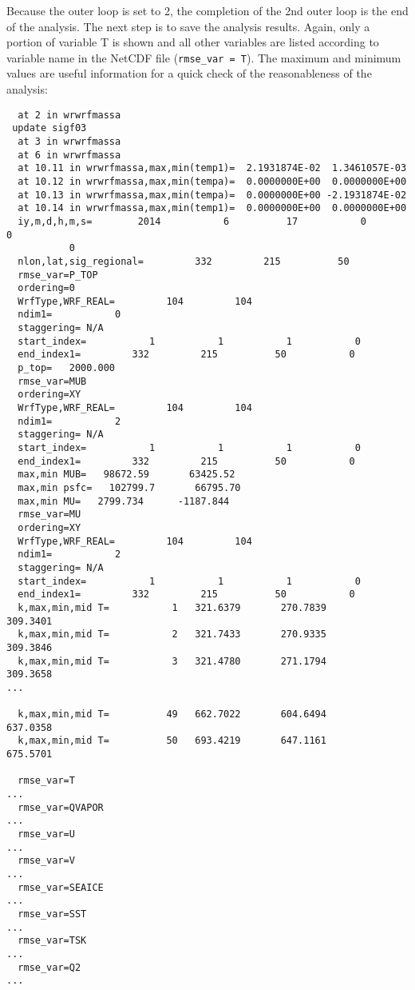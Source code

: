 Because the outer loop is set to 2, the completion of the 2nd outer loop is the end of the analysis. The next step is to save the analysis results. Again, only a portion of variable T is shown and all other variables are listed according to variable name in the NetCDF file (\verb|rmse_var = T|). The maximum and minimum values are useful information for a quick check of the reasonableness of the analysis:

\begin{scriptsize}
\begin{verbatim} 
  at 2 in wrwrfmassa
 update sigf03
  at 3 in wrwrfmassa
  at 6 in wrwrfmassa
  at 10.11 in wrwrfmassa,max,min(temp1)=  2.1931874E-02  1.3461057E-03
  at 10.12 in wrwrfmassa,max,min(tempa)=  0.0000000E+00  0.0000000E+00
  at 10.13 in wrwrfmassa,max,min(tempa)=  0.0000000E+00 -2.1931874E-02
  at 10.14 in wrwrfmassa,max,min(temp1)=  0.0000000E+00  0.0000000E+00
  iy,m,d,h,m,s=        2014           6          17           0           0
           0
  nlon,lat,sig_regional=         332         215          50
  rmse_var=P_TOP
  ordering=0
  WrfType,WRF_REAL=         104         104
  ndim1=           0
  staggering= N/A
  start_index=           1           1           1           0
  end_index1=         332         215          50           0
  p_top=   2000.000
  rmse_var=MUB
  ordering=XY
  WrfType,WRF_REAL=         104         104
  ndim1=           2
  staggering= N/A
  start_index=           1           1           1           0
  end_index1=         332         215          50           0
  max,min MUB=   98672.59       63425.52
  max,min psfc=   102799.7       66795.70
  max,min MU=   2799.734      -1187.844
  rmse_var=MU
  ordering=XY
  WrfType,WRF_REAL=         104         104
  ndim1=           2
  staggering= N/A
  start_index=           1           1           1           0
  end_index1=         332         215          50           0
  k,max,min,mid T=           1   321.6379       270.7839       309.3401
  k,max,min,mid T=           2   321.7433       270.9335       309.3846
  k,max,min,mid T=           3   321.4780       271.1794       309.3658
...

  k,max,min,mid T=          49   662.7022       604.6494       637.0358
  k,max,min,mid T=          50   693.4219       647.1161       675.5701

  rmse_var=T
...
  rmse_var=QVAPOR
...
  rmse_var=U
...
  rmse_var=V
...
  rmse_var=SEAICE
...
  rmse_var=SST
...
  rmse_var=TSK
...
  rmse_var=Q2
...
\end{verbatim}
\end{scriptsize}
